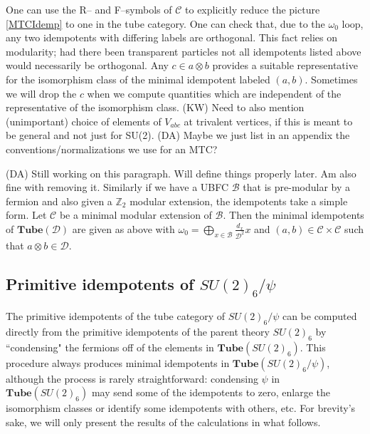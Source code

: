 \documentclass[12pt,a4paper]{article}
\newcommand{\tp}{\otimes}
\newcommand{\mcb}{\mathcal{B}}
\newcommand{\mcd}{\mathcal{D}}
\newcommand{\mcc}{\mathcal{C}}
\newcommand{\zt}{\mathbb{Z}_2}
\newcommand{\tube}{\textbf{Tube}}
\newcommand{\kw}[1]{{\color{kwcolor}\footnotesize{(KW) #1}}}
\newcommand{\dave}[1]{{\color{ao(english)}\footnotesize{(DA) #1}}}
\newcommand{\ethan}[1]{{\color{amethyst}\footnotesize{(EL) #1}}}
\begin{document}
One can use the R-- and F--symbols of $\mcc$ to explicitly reduce the picture \eqref{MTCIdemp} to one in the tube category.
One can check that, due to the $\omega_0$ loop, 
any two idempotents with differing labels are orthogonal. 
This fact relies on modularity; had there been transparent particles not all idempotents listed above would necessarily be orthogonal.
Any $c \in a \tp b$ provides a suitable representative for the isomorphism class of the minimal idempotent labeled $(a,b)$.
Sometimes we will drop the $c$ when we compute quantities which are independent of the representative of the isomorphism class.
\kw{Need to also mention (unimportant) choice of elements of $V_{abc}$ at trivalent vertices, 
if this is meant to be general and not just for SU(2).}
\dave{Maybe we just list in an appendix the conventions/normalizations we use for an MTC?}

\dave{Still working on this paragraph. 
Will define things properly later.
Am also fine with removing it.}
Similarly if we have a UBFC $\mcb$ that is pre-modular by a fermion and also given a $\zt$ modular extension, 
the idempotents take a simple form.  
Let $\mcc$ be a minimal modular extension of $\mcb$.
Then the minimal idempotents of $\tube(\mcd)$ are given as above with $\omega_0 = \bigoplus_{x \in \mcb} \frac{d_x}{\mcd^2} x$ and $(a,b) \in \mcc \times \mcc$ such that $a \tp b \in \mcd$. 
\subsection{Primitive idempotents of $SU(2)_6/\psi$}

The primitive idempotents of the tube category of $SU(2)_6/\psi$ can be computed directly 
from the primitive idempotents of the parent theory $SU(2)_6$ by ``condensing" the fermions off of the elements in $\tube(SU(2)_6)$. 
This procedure always produces minimal idempotents in $\tube(SU(2)_6/\psi)$, 
although the process is rarely straightforward: condensing $\psi$ in $\tube(SU(2)_6)$ 
may send some of the idempotents to zero, enlarge the isomorphism classes or identify some idempotents with others, etc.
For brevity's sake, we will only present the results of the calculations in what follows. 
\end{document}
